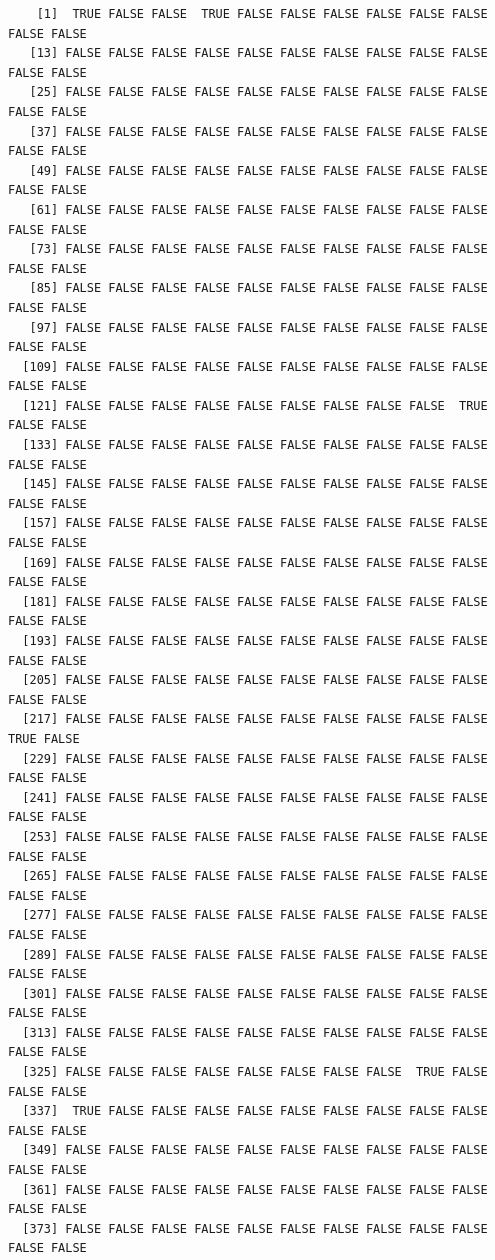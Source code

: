 \documentclass[
  a4paper,
  DIV=11,
  numbers=noendperiod]{scrartcl}
\begin{document}
\begin{verbatim}
    [1]  TRUE FALSE FALSE  TRUE FALSE FALSE FALSE FALSE FALSE FALSE FALSE FALSE
   [13] FALSE FALSE FALSE FALSE FALSE FALSE FALSE FALSE FALSE FALSE FALSE FALSE
   [25] FALSE FALSE FALSE FALSE FALSE FALSE FALSE FALSE FALSE FALSE FALSE FALSE
   [37] FALSE FALSE FALSE FALSE FALSE FALSE FALSE FALSE FALSE FALSE FALSE FALSE
   [49] FALSE FALSE FALSE FALSE FALSE FALSE FALSE FALSE FALSE FALSE FALSE FALSE
   [61] FALSE FALSE FALSE FALSE FALSE FALSE FALSE FALSE FALSE FALSE FALSE FALSE
   [73] FALSE FALSE FALSE FALSE FALSE FALSE FALSE FALSE FALSE FALSE FALSE FALSE
   [85] FALSE FALSE FALSE FALSE FALSE FALSE FALSE FALSE FALSE FALSE FALSE FALSE
   [97] FALSE FALSE FALSE FALSE FALSE FALSE FALSE FALSE FALSE FALSE FALSE FALSE
  [109] FALSE FALSE FALSE FALSE FALSE FALSE FALSE FALSE FALSE FALSE FALSE FALSE
  [121] FALSE FALSE FALSE FALSE FALSE FALSE FALSE FALSE FALSE  TRUE FALSE FALSE
  [133] FALSE FALSE FALSE FALSE FALSE FALSE FALSE FALSE FALSE FALSE FALSE FALSE
  [145] FALSE FALSE FALSE FALSE FALSE FALSE FALSE FALSE FALSE FALSE FALSE FALSE
  [157] FALSE FALSE FALSE FALSE FALSE FALSE FALSE FALSE FALSE FALSE FALSE FALSE
  [169] FALSE FALSE FALSE FALSE FALSE FALSE FALSE FALSE FALSE FALSE FALSE FALSE
  [181] FALSE FALSE FALSE FALSE FALSE FALSE FALSE FALSE FALSE FALSE FALSE FALSE
  [193] FALSE FALSE FALSE FALSE FALSE FALSE FALSE FALSE FALSE FALSE FALSE FALSE
  [205] FALSE FALSE FALSE FALSE FALSE FALSE FALSE FALSE FALSE FALSE FALSE FALSE
  [217] FALSE FALSE FALSE FALSE FALSE FALSE FALSE FALSE FALSE FALSE  TRUE FALSE
  [229] FALSE FALSE FALSE FALSE FALSE FALSE FALSE FALSE FALSE FALSE FALSE FALSE
  [241] FALSE FALSE FALSE FALSE FALSE FALSE FALSE FALSE FALSE FALSE FALSE FALSE
  [253] FALSE FALSE FALSE FALSE FALSE FALSE FALSE FALSE FALSE FALSE FALSE FALSE
  [265] FALSE FALSE FALSE FALSE FALSE FALSE FALSE FALSE FALSE FALSE FALSE FALSE
  [277] FALSE FALSE FALSE FALSE FALSE FALSE FALSE FALSE FALSE FALSE FALSE FALSE
  [289] FALSE FALSE FALSE FALSE FALSE FALSE FALSE FALSE FALSE FALSE FALSE FALSE
  [301] FALSE FALSE FALSE FALSE FALSE FALSE FALSE FALSE FALSE FALSE FALSE FALSE
  [313] FALSE FALSE FALSE FALSE FALSE FALSE FALSE FALSE FALSE FALSE FALSE FALSE
  [325] FALSE FALSE FALSE FALSE FALSE FALSE FALSE FALSE  TRUE FALSE FALSE FALSE
  [337]  TRUE FALSE FALSE FALSE FALSE FALSE FALSE FALSE FALSE FALSE FALSE FALSE
  [349] FALSE FALSE FALSE FALSE FALSE FALSE FALSE FALSE FALSE FALSE FALSE FALSE
  [361] FALSE FALSE FALSE FALSE FALSE FALSE FALSE FALSE FALSE FALSE FALSE FALSE
  [373] FALSE FALSE FALSE FALSE FALSE FALSE FALSE FALSE FALSE FALSE FALSE FALSE

\end{verbatim}
\end{document}
